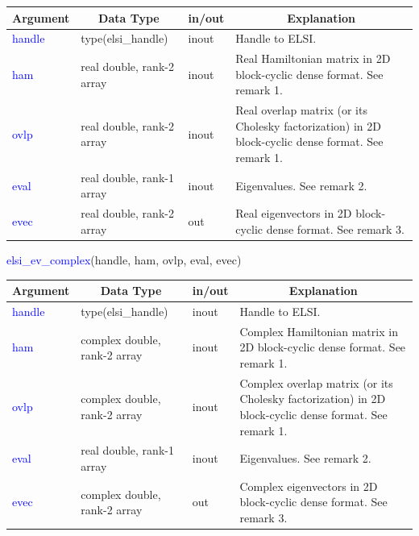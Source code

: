 \documentclass{report}
\begin{document}
\begin{tabular}[]{|p{20mm}|p{45mm}|p{15mm}|p{85mm}|}
\hline
\multicolumn{1}{|c|}{\textbf{Argument}} & \multicolumn{1}{c|}{\textbf{Data Type}} & \multicolumn{1}{c|}{\textbf{in/out}} & \multicolumn{1}{c|}{\textbf{Explanation}}\\
\hline
\textcolor{blue}{handle} & type(elsi\_handle)        & inout & Handle to ELSI.\\
\hline
\textcolor{blue}{ham}    & real double, rank-2 array & inout & Real Hamiltonian matrix in 2D block-cyclic dense format.  See remark 1.\\
\hline
\textcolor{blue}{ovlp}   & real double, rank-2 array & inout & Real overlap matrix (or its Cholesky factorization) in 2D block-cyclic dense format.  See remark 1.\\
\hline
\textcolor{blue}{eval}   & real double, rank-1 array & inout & Eigenvalues.  See remark 2.\\
\hline
\textcolor{blue}{evec}   & real double, rank-2 array & out   & Real eigenvectors in 2D block-cyclic dense format.  See remark 3.\\
\hline
\end{tabular}

\newpage
\begin{labeling}{\hspace{6cm}}
\item [\hspace{0.3cm} \textcolor{blue}{elsi\_ev\_complex}(handle, ham, ovlp, eval, evec)]
\end{labeling}

\begin{tabular}[]{|p{20mm}|p{45mm}|p{15mm}|p{85mm}|}
\hline
\multicolumn{1}{|c|}{\textbf{Argument}} & \multicolumn{1}{c|}{\textbf{Data Type}} & \multicolumn{1}{c|}{\textbf{in/out}} & \multicolumn{1}{c|}{\textbf{Explanation}}\\
\hline
\textcolor{blue}{handle} & type(elsi\_handle)           & inout & Handle to ELSI.\\
\hline
\textcolor{blue}{ham}    & complex double, rank-2 array & inout & Complex Hamiltonian matrix in 2D block-cyclic dense format.  See remark 1.\\
\hline
\textcolor{blue}{ovlp}   & complex double, rank-2 array & inout & Complex overlap matrix (or its Cholesky factorization) in 2D block-cyclic dense format.  See remark 1.\\
\hline
\textcolor{blue}{eval}   & real double, rank-1 array    & inout & Eigenvalues.  See remark 2.\\
\hline
\textcolor{blue}{evec}   & complex double, rank-2 array & out   & Complex eigenvectors in 2D block-cyclic dense format.  See remark 3.\\
\hline
\end{tabular}
\end{document}
